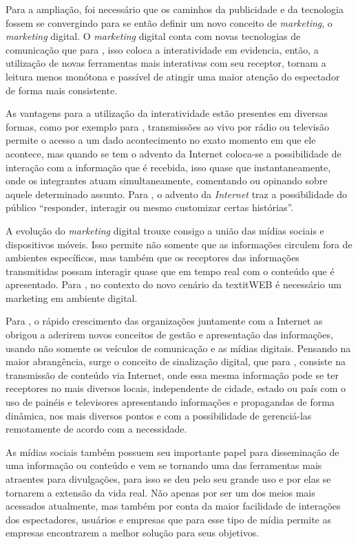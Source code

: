Para a ampliação, foi necessário que os caminhos da publicidade e da tecnologia fossem se convergindo para se então definir um novo conceito de \textit{marketing}, o \textit{marketing} digital. O \textit{marketing} digital conta com novas tecnologias de comunicação que para \cite[p.2]{escobar2007}, isso coloca a interatividade em evidencia, então, a utilização de novas ferramentas mais interativas com seu receptor, tornam a leitura menos monótona e passível de atingir uma maior atenção do espectador de forma mais consistente.  

As vantagens para a utilização da interatividade estão presentes em diversas formas, como por exemplo para \cite[p.4]{escobar2007}, transmissões ao vivo por rádio ou televisão permite o acesso a um dado acontecimento no exato momento em que ele acontece, mas quando se tem o advento da Internet coloca-se a possibilidade de interação com a informação que é recebida, isso quase que instantaneamente, onde os integrantes atuam simultaneamente, comentando ou opinando sobre aquele determinado assunto. Para \cite{deuze2002}, o advento da \textit{Internet} traz a possibilidade do público ``responder, interagir ou mesmo customizar certas histórias''. 

A evolução do \textit{marketing} digital trouxe consigo a união das mídias sociais e dispositivos móveis. Isso permite não somente que as informações circulem fora de ambientes específicos, mas também que os receptores das informações transmitidas possam interagir quase que em tempo real com o conteúdo que é apresentado. Para \cite{santos2014}, no contexto do novo cenário da textit{WEB} é necessário um marketing em ambiente digital.

Para \cite[p.7]{machado2010}, o rápido crescimento das organizações juntamente com a Internet as obrigou a aderirem novos conceitos de gestão e apresentação das informações, usando não somente os veículos de comunicação e as mídias digitais. Pensando na maior abrangência, surge o conceito de sinalização digital, que para \cite[p.37]{machado2010}, consiste na transmissão de conteúdo via Internet, onde essa mesma informação pode se ter receptores no mais diversos locais, independente de cidade, estado ou país com o uso de painéis e televisores apresentando informações e propagandas de forma dinâmica, nos mais diversos pontos e com a possibilidade de gerenciá-las remotamente de acordo com a necessidade. 

As mídias sociais também possuem seu importante papel para disseminação de uma informação ou conteúdo e vem se tornando uma das ferramentas mais atraentes para divulgações, para \cite{rosa2010} isso se deu pelo seu grande uso e por elas se tornarem a extensão da vida real. Não apenas por ser um dos meios mais acessados atualmente, mas também por conta da maior facilidade de interações dos espectadores, usuários e empresas que para \cite{rosa2010} esse tipo de mídia permite as empresas encontrarem a melhor solução para seus objetivos. 

